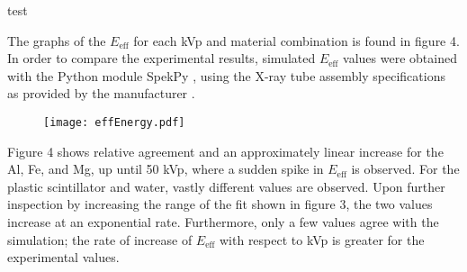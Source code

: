 %     

%     

%     




%     

%     

\begin{table}[H]
    \small
    \noindent\makebox[\textwidth]{%
    
    }
    \caption{test}
\end{table}



The graphs of the $E_{\text{eff}}$ for each kVp and material combination is found in figure 4. In order to compare the experimental results, simulated $E_{\text{eff}}$ values were obtained with the Python module SpekPy \cite{SpekPy}, using the X-ray tube assembly specifications as provided by the manufacturer \cite{CArm}.


\begin{figure}[H]
    \centering
    \texttt{[image: effEnergy.pdf]}
    \caption{}
\end{figure}

Figure 4 shows relative agreement and an approximately linear increase for the Al, Fe, and Mg, up until 50 kVp, where a sudden spike in $E_{\text{eff}}$ is observed. For the plastic scintillator and water, vastly different values are observed. Upon further inspection by increasing the range of the fit shown in figure 3, the two values increase at an exponential rate. Furthermore, only a few values agree with the simulation; the rate of increase of $E_{\text{eff}}$ with respect to kVp is greater for the experimental values.

